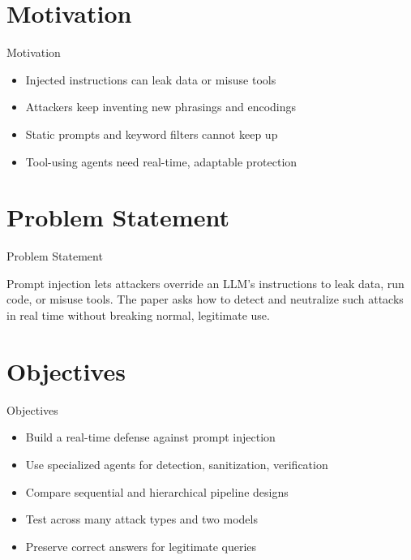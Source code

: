 \documentclass[10pt]{beamer}
\begin{document}
\section{Motivation}
\begin{frame}{Motivation}
\begin{itemize}
  \item Injected instructions can leak data or misuse tools
  \item Attackers keep inventing new phrasings and encodings
  \item Static prompts and keyword filters cannot keep up
  \item Tool-using agents need real-time, adaptable protection
\end{itemize}
\end{frame}

\section{Problem Statement}
\begin{frame}{Problem Statement}
  \begin{block}{}
  Prompt injection lets attackers override an LLM's instructions to leak data, run code, or misuse tools. The paper asks how to detect and neutralize such attacks in real time without breaking normal, legitimate use.
  \end{block}
\end{frame}

\section{Objectives}
\begin{frame}{Objectives}
\begin{itemize}
  \item Build a real-time defense against prompt injection
  \item Use specialized agents for detection, sanitization, verification
  \item Compare sequential and hierarchical pipeline designs
  \item Test across many attack types and two models
  \item Preserve correct answers for legitimate queries
\end{itemize}
\end{frame}
\end{document}
